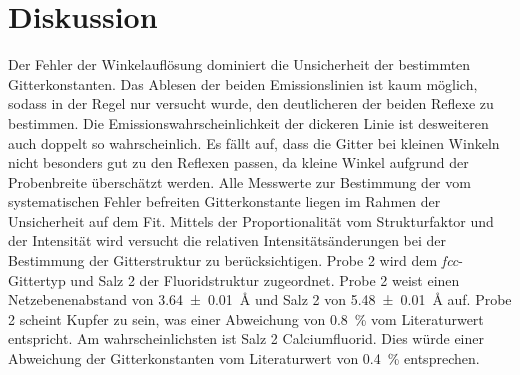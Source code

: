 \section{Diskussion}\label{sec:Diskussion}
Der Fehler der Winkelauflösung  dominiert die Unsicherheit der bestimmten
Gitterkonstanten. 
Das Ablesen der beiden Emissionslinien ist kaum möglich,
sodass in der Regel nur versucht wurde, den deutlicheren der beiden Reflexe zu bestimmen.
Die Emissionswahrscheinlichkeit der dickeren Linie ist desweiteren auch
doppelt so wahrscheinlich. 
Es fällt auf, dass die Gitter bei kleinen Winkeln nicht besonders gut zu den
Reflexen passen, da kleine Winkel aufgrund der Probenbreite überschätzt werden.
Alle Messwerte zur Bestimmung der vom systematischen Fehler befreiten
Gitterkonstante liegen im Rahmen der Unsicherheit auf dem Fit.
Mittels der Proportionalität vom Strukturfaktor und der Intensität wird
versucht die relativen Intensitätsänderungen bei der Bestimmung der
Gitterstruktur zu berücksichtigen.
Probe 2 wird dem \textit{fcc}-Gittertyp und Salz 2 der Fluoridstruktur zugeordnet. 
Probe 2 weist einen Netzebenenabstand von \SI{3.64 +- 0.01}{\angstrom}
und Salz 2 von \SI{5.48 +- 0.01}{\angstrom} auf.
Probe 2 scheint Kupfer zu sein, was einer Abweichung von \SI{0.8}{\percent} vom Literaturwert
\cite{kupfer} entspricht.
Am wahrscheinlichsten ist Salz 2 Calciumfluorid. Dies würde einer Abweichung
der Gitterkonstanten vom Literaturwert \cite{CaF2} von \SI{0.4}{\percent} entsprechen.
